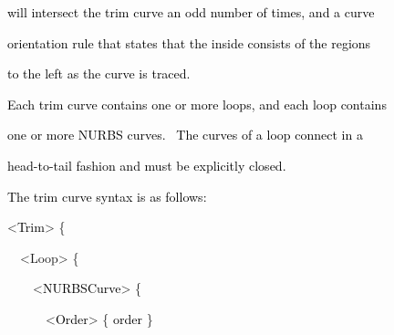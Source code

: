 \documentclass[a4paper]{article}
\newcommand\textstyleOOoComputerKeyWord[1]{\textrm{\textcolor[rgb]{0.0,0.0,0.5019608}{#1}}}
\newcommand\textstyleOOoAssemblerSpecialChar[1]{\textrm{\textcolor[rgb]{0.0,0.5019608,0.0}{#1}}}
\newcommand\textstyleOOoAssemblerIdent[1]{\textrm{\textcolor{black}{#1}}}
\newcommand\textstyleOOoAssemblerInstruction[1]{\textrm{\textcolor[rgb]{0.0,0.0,0.49803922}{#1}}}
\begin{document}
{\color{black}
\textstyleOOoComputerKeyWord{\textcolor{black}{\ \ will intersect the trim curve an odd number of times, and a curve}}}

{\color{black}
\textstyleOOoComputerKeyWord{\textcolor{black}{\ \ orientation rule that states that the inside consists of the
regions}}}

{\color{black}
\textstyleOOoComputerKeyWord{\textcolor{black}{\ \ to the left as the curve is traced.}}}


\bigskip

{\color{black}
\textstyleOOoComputerKeyWord{\textcolor{black}{\ \ Each trim curve contains one or more loops, and each loop contains}}}

{\color{black}
\textstyleOOoComputerKeyWord{\textcolor{black}{\ \ one or more NURBS curves. \ The curves of a loop connect in a}}}

{\color{black}
\textstyleOOoComputerKeyWord{\textcolor{black}{\ \ head-to-tail fashion and must be explicitly closed.}}}


\bigskip

{\color{black}
\textstyleOOoComputerKeyWord{\textcolor{black}{\ \ The trim curve syntax is as follows:}}}


\bigskip

{\color{black}
\textstyleOOoComputerKeyWord{\textcolor{black}{\ \ }}\textstyleOOoAssemblerSpecialChar{{\textless}}\textstyleOOoAssemblerIdent{Trim}\textstyleOOoAssemblerSpecialChar{{\textgreater}}\textstyleOOoComputerKeyWord{\textcolor{black}{
}}\textstyleOOoAssemblerSpecialChar{\{}}

{\color{black}
\textstyleOOoComputerKeyWord{\textcolor{black}{\ \ \ \ }}\textstyleOOoAssemblerSpecialChar{{\textless}}\textstyleOOoAssemblerInstruction{Loop}\textstyleOOoAssemblerSpecialChar{{\textgreater}}\textstyleOOoComputerKeyWord{\textcolor{black}{
}}\textstyleOOoAssemblerSpecialChar{\{}}

{\color{black}
\textstyleOOoComputerKeyWord{\textcolor{black}{\ \ \ \ \ \ }}\textstyleOOoAssemblerSpecialChar{{\textless}}\textstyleOOoAssemblerIdent{NURBSCurve}\textstyleOOoAssemblerSpecialChar{{\textgreater}}\textstyleOOoComputerKeyWord{\textcolor{black}{
}}\textstyleOOoAssemblerSpecialChar{\{}}

{\color{black}
\textstyleOOoComputerKeyWord{\textcolor{black}{\ \ \ \ \ \ \ \ }}\textstyleOOoAssemblerSpecialChar{{\textless}}\textstyleOOoAssemblerIdent{Order}\textstyleOOoAssemblerSpecialChar{{\textgreater}}\textstyleOOoComputerKeyWord{\textcolor{black}{
}}\textstyleOOoAssemblerSpecialChar{\{}\textstyleOOoComputerKeyWord{\textcolor{black}{
}}\textstyleOOoAssemblerIdent{order}\textstyleOOoComputerKeyWord{\textcolor{black}{
}}\textstyleOOoAssemblerSpecialChar{\}}}
\end{document}
